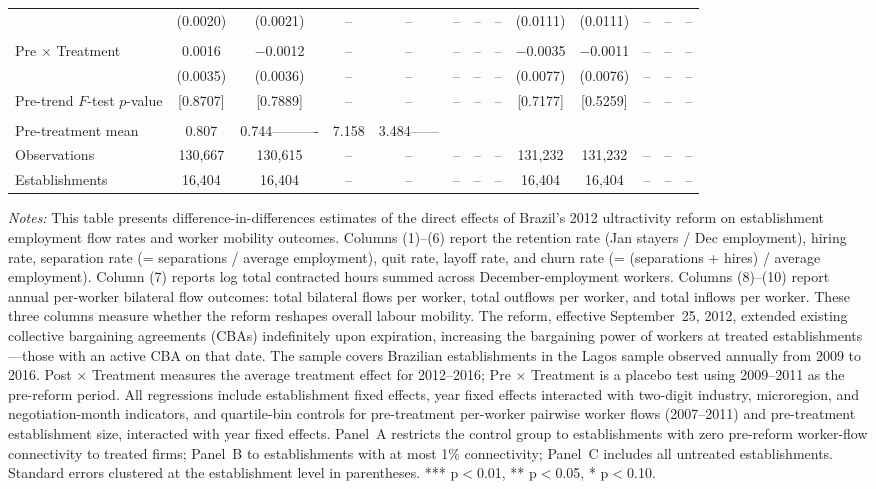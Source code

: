 \documentclass[12pt,letterpaper]{article}
\begin{document}
\begin{table}[]
\begin{threeparttable}
\begin{tabular}{lcccccccccccc}
  & (0.0020) & (0.0021) & -- & -- & -- & -- & -- & (0.0111) & (0.0111) & -- & -- & -- \\
  &  &  &  &  &  &  &  &  &  &  &  & \\
Pre $\times$ Treatment & 0.0016 & $-$0.0012 & -- & -- & -- & -- & -- & $-$0.0035 & $-$0.0011 & -- & -- & -- \\
  & (0.0035) & (0.0036) & -- & -- & -- & -- & -- & (0.0077) & (0.0076) & -- & -- & -- \\
Pre-trend $F$-test $p$-value & [0.8707] & [0.7889] & -- & -- & -- & -- & -- & [0.7177] & [0.5259] & -- & -- & -- \\
  &  &  &  &  &  &  &  &  &  &  &  & \\
Pre-treatment mean & 0.807 & 0.744---------- & 7.158 & 3.484------ \\
Observations & 130{,}667 & 130{,}615 & -- & -- & -- & -- & -- & 131{,}232 & 131{,}232 & -- & -- & -- \\
Establishments & 16{,}404 & 16{,}404 & -- & -- & -- & -- & -- & 16{,}404 & 16{,}404 & -- & -- & -- \\
\bottomrule
\end{tabular}
\scriptsize
\begin{tablenotes}
\item \textit{Notes:} This table presents difference-in-differences estimates of the direct effects of Brazil's 2012 ultractivity reform on establishment employment flow rates and worker mobility outcomes. Columns (1)--(6) report the retention rate (Jan stayers / Dec employment), hiring rate, separation rate (= separations / average employment), quit rate, layoff rate, and churn rate (= (separations + hires) / average employment). Column (7) reports log total contracted hours summed across December-employment workers. Columns (8)--(10) report annual per-worker bilateral flow outcomes: total bilateral flows per worker, total outflows per worker, and total inflows per worker. These three columns measure whether the reform reshapes overall labour mobility. The reform, effective September~25, 2012, extended existing collective bargaining agreements (CBAs) indefinitely upon expiration, increasing the bargaining power of workers at treated establishments---those with an active CBA on that date. The sample covers Brazilian establishments in the Lagos sample observed annually from 2009 to 2016. Post $\times$ Treatment measures the average treatment effect for 2012--2016; Pre $\times$ Treatment is a placebo test using 2009--2011 as the pre-reform period. All regressions include establishment fixed effects, year fixed effects interacted with two-digit industry, microregion, and negotiation-month indicators, and quartile-bin controls for pre-treatment per-worker pairwise worker flows (2007--2011) and pre-treatment establishment size, interacted with year fixed effects. Panel~A restricts the control group to establishments with zero pre-reform worker-flow connectivity to treated firms; Panel~B to establishments with at most 1\% connectivity; Panel~C includes all untreated establishments. Standard errors clustered at the establishment level in parentheses. *** p$<$0.01, ** p$<$0.05, * p$<$0.10.

\end{tablenotes}
\end{threeparttable}
\end{table}
\end{document}
